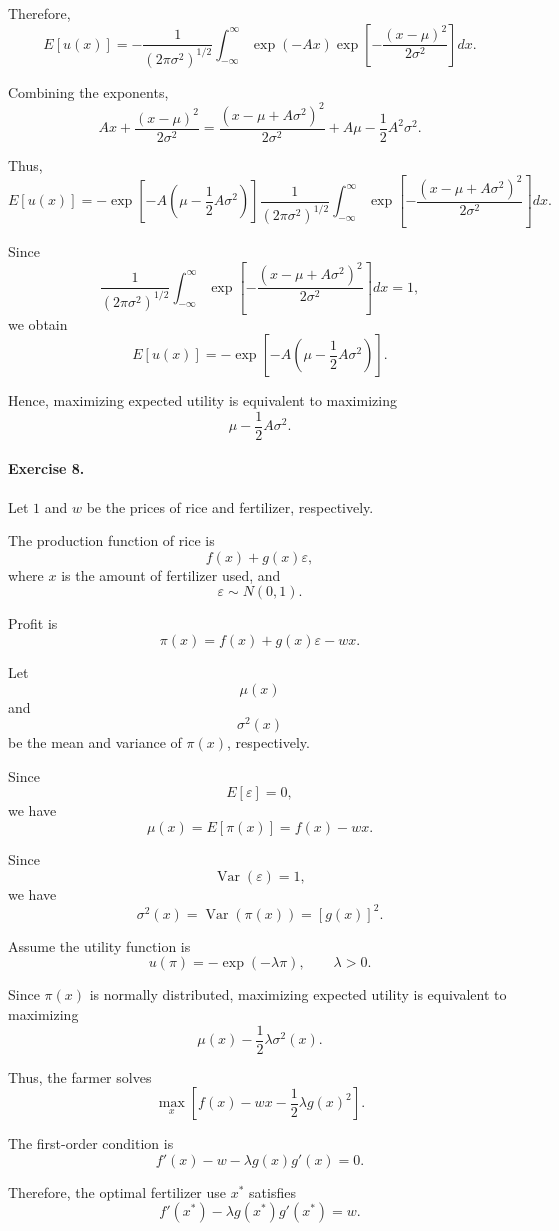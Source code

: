 Therefore,
\[
E[u(x)]
=
-\frac{1}{(2\pi\sigma^2)^{1/2}}
\int_{-\infty}^{\infty}
\exp(-Ax)
\exp\left[
-\frac{(x-\mu)^2}{2\sigma^2}
\right]dx.
\]

Combining the exponents,
\[
Ax+\frac{(x-\mu)^2}{2\sigma^2}
=
\frac{(x-\mu+A\sigma^2)^2}{2\sigma^2}
+
A\mu
-
\frac{1}{2}A^2\sigma^2.
\]

Thus,
\[
E[u(x)]
=
-
\exp\left[
-A\left(
\mu-\frac{1}{2}A\sigma^2
\right)
\right]
\frac{1}{(2\pi\sigma^2)^{1/2}}
\int_{-\infty}^{\infty}
\exp\left[
-\frac{(x-\mu+A\sigma^2)^2}{2\sigma^2}
\right]dx.
\]

Since
\[
\frac{1}{(2\pi\sigma^2)^{1/2}}
\int_{-\infty}^{\infty}
\exp\left[
-\frac{(x-\mu+A\sigma^2)^2}{2\sigma^2}
\right]dx
=
1,
\]
we obtain
\[
E[u(x)]
=
-
\exp\left[
-A\left(
\mu-\frac{1}{2}A\sigma^2
\right)
\right].
\]

Hence, maximizing expected utility is equivalent to maximizing
\[
\mu-\frac{1}{2}A\sigma^2.
\]

\paragraph{Exercise 8.}
Let \(1\) and \(w\) be the prices of rice and fertilizer, respectively.


The production function of rice is
\[
f(x)+g(x)\varepsilon,
\]
where \(x\) is the amount of fertilizer used, and
\[
\varepsilon\sim N(0,1).
\]

Profit is
\[
\pi(x)
=
f(x)+g(x)\varepsilon-wx.
\]

Let
\[
\mu(x)
\]
and
\[
\sigma^2(x)
\]
be the mean and variance of \(\pi(x)\), respectively.

Since
\[
E[\varepsilon]=0,
\]
we have
\[
\mu(x)
=
E[\pi(x)]
=
f(x)-wx.
\]

Since
\[
\operatorname{Var}(\varepsilon)=1,
\]
we have
\[
\sigma^2(x)
=
\operatorname{Var}(\pi(x))
=
[g(x)]^2.
\]

Assume the utility function is
\[
u(\pi)
=
-\exp(-\lambda\pi),
\qquad
\lambda>0.
\]

Since \(\pi(x)\) is normally distributed, maximizing expected utility is equivalent to maximizing
\[
\mu(x)-\frac{1}{2}\lambda\sigma^2(x).
\]

Thus, the farmer solves
\[
\max_x
\left[
f(x)-wx
-
\frac{1}{2}\lambda g(x)^2
\right].
\]

The first-order condition is
\[
f'(x)-w-\lambda g(x)g'(x)=0.
\]

Therefore, the optimal fertilizer use \(x^*\) satisfies
\[
f'(x^*)-\lambda g(x^*)g'(x^*)=w.
\]

